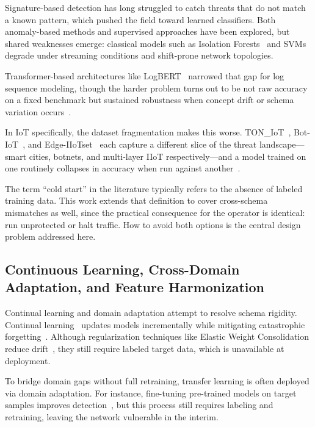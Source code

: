 \documentclass[conference]{IEEEtran}
\begin{document}
Signature-based detection has long struggled to catch threats that do not match a known pattern, which pushed the field toward learned classifiers. Both anomaly-based methods and supervised approaches have been explored, but shared weaknesses emerge: classical models such as Isolation Forests~\cite{liu2008isolation} and SVMs~\cite{wang2004anomaly} degrade under streaming conditions and shift-prone network topologies.

Transformer-based architectures like LogBERT~\cite{guo2021logbert} narrowed that gap for log sequence modeling, though the harder problem turns out to be not raw accuracy on a fixed benchmark but sustained robustness when concept drift or schema variation occurs~\cite{cui2024logeval}.

In IoT specifically, the dataset fragmentation makes this worse. TON\_IoT~\cite{anwar2020toniot}, Bot-IoT~\cite{koroniotis2019botiot}, and Edge-IIoTset~\cite{ferrag2022edgeiiotset} each capture a different slice of the threat landscape---smart cities, botnets, and multi-layer IIoT respectively---and a model trained on one routinely collapses in accuracy when run against another~\cite{cantone2024generalization}.

The term ``cold start'' in the literature typically refers to the absence of labeled training data. This work extends that definition to cover cross-schema mismatches as well, since the practical consequence for the operator is identical: run unprotected or halt traffic. How to avoid both options is the central design problem addressed here.

\subsection{Continuous Learning, Cross-Domain Adaptation, and Feature Harmonization}
\label{subsec:continual}

Continual learning and domain adaptation attempt to resolve schema rigidity. Continual learning~\cite{ring1997child} updates models incrementally while mitigating catastrophic forgetting~\cite{kirkpatrick2017ewc}. Although regularization techniques like Elastic Weight Consolidation reduce drift~\cite{chen2024ssf}, they still require labeled target data, which is unavailable at deployment.

To bridge domain gaps without full retraining, transfer learning is often deployed via domain adaptation. For instance, fine-tuning pre-trained models on target samples improves detection~\cite{zhao2020transfer}, but this process still requires labeling and retraining, leaving the network vulnerable in the interim.
\end{document}
